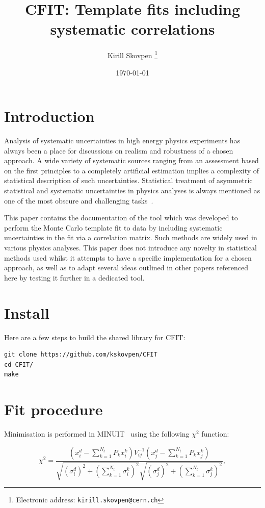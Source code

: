 \documentclass[12pt]{article}
\title{CFIT: Template fits including systematic correlations}
\author{Kirill Skovpen
\thanks{Electronic address: \texttt{kirill.skovpen@cern.ch}}}
\affil{Institut Pluridisciplinaire Hubert Curien, CNRS/IN2P3, Strasbourg, France}
\date{\today}
\begin{document}
\maketitle

\tableofcontents

\newpage

\section{Introduction}

Analysis of systematic uncertainties in high energy physics
experiments has always been a place for discussions on realism
and robustness of a chosen approach.
A wide variety of systematic sources ranging from an assessment based on
the first principles to a completely artificial estimation implies a
complexity of statistical description of such uncertainties.
Statistical treatment of asymmetric statistical and systematic
uncertainties in physics analyses is always mentioned as one of the
most obscure and challenging tasks~\cite{BarlowStat,Barlow}.

This paper contains the documentation
of the tool which was developed to perform the Monte Carlo template fit to data by
including systematic uncertainties in the fit via a correlation matrix.
Such methods are widely used in various physics analyses. This
paper does not introduce any novelty in statistical methods used
whilst it attempts to have a specific implementation for a chosen
approach, as well as to adapt several ideas outlined in other papers referenced
here by testing it further in a dedicated tool.

\section{Install}

Here are a few steps to build the shared library for CFIT:

\begin{verbatim}
git clone https://github.com/kskovpen/CFIT
cd CFIT/
make
\end{verbatim}

\section{Fit procedure}

Minimisation is performed in MINUIT~\cite{Minuit} using the following
$\chi^2$ function:

\begin{equation}
\chi^2 = \frac{
(x^{d}_{i}-\sum\limits_{k=1}^{N_{t}}P_{k}x^{k}_{i})
V_{ij}^{-1}
(x^{d}_{j}-\sum\limits_{k=1}^{N_{t}}P_{k}x^{k}_{j})
}
{\sqrt{
(\sigma_{i}^{d})^2 +
(\sum\limits_{k=1}^{N_{t}}\sigma_{i}^{k})^2
}
\sqrt{
(\sigma_{j}^{d})^2 +
(\sum\limits_{k=1}^{N_{t}}\sigma_{j}^{k})^2
}
},
\end{equation}
\end{document}
